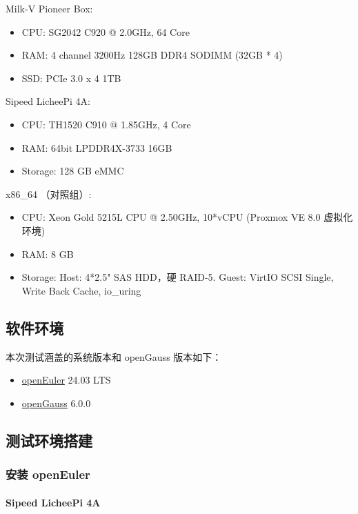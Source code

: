 \documentclass{article}
\begin{document}
Milk-V Pioneer Box:
\begin{itemize}
    \item CPU: SG2042 C920 @ 2.0GHz, 64 Core
    \item RAM: 4 channel 3200Hz 128GB DDR4 SODIMM (32GB * 4)
    \item SSD: PCIe 3.0 x 4 1TB
\end{itemize}

Sipeed LicheePi 4A:
\begin{itemize}
    \item CPU: TH1520 C910 @ 1.85GHz, 4 Core
    \item RAM: 64bit LPDDR4X-3733 16GB
    \item Storage: 128 GB eMMC
\end{itemize}

x86\_64 （对照组）:
\begin{itemize}
    \item CPU: Xeon Gold 5215L CPU @ 2.50GHz, 10*vCPU (Proxmox VE 8.0 虚拟化环境)
    \item RAM: 8 GB
    \item Storage: Host: 4*2.5" SAS HDD，硬 RAID-5. Guest: VirtIO SCSI Single, Write Back Cache, io\_uring
\end{itemize}

\subsection{软件环境}
本次测试涵盖的系统版本和 openGauss 版本如下：

\begin{itemize}
    \item \href{https://www.openeuler.org/zh/download/?version=openEuler%2024.03%20LTS}{openEuler} 24.03 LTS
    \item \href{https://gitee.com/opengauss/riscv}{openGauss} 6.0.0
\end{itemize}

\subsection{测试环境搭建}

\subsubsection{安装 openEuler}

\paragraph{Sipeed LicheePi 4A}
\end{document}
